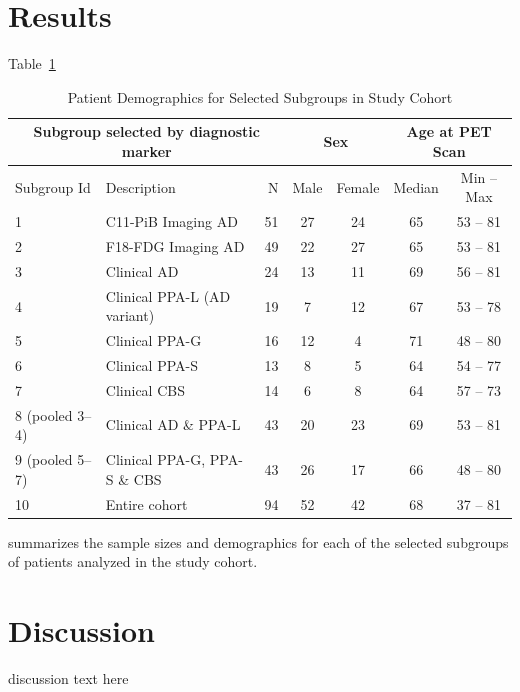\documentclass[10pt,twocolumn,twoside]{article}
\begin{document}
\section*{Results}
\label{secResults}
Table~\ref{tabPatDemo} 
\begin{table}[ht]\begin{center}
\caption{Patient Demographics for Selected Subgroups in Study Cohort}
\label{tabPatDemo}
\begin{tabular}{l l r | c c | c c  }
\multicolumn{3}{c|}{Subgroup selected by diagnostic marker} 
	& \multicolumn{2}{c|}{Sex} & \multicolumn{2}{c}{Age at PET Scan} \\ \hline
Subgroup Id      & Description                    & N  & Male & Female & Median & Min -- Max \\ \hline
1                & C11-PiB Imaging AD             & 51 & 27   & 24    & 65 & 53 -- 81 \\
2                & F18-FDG Imaging AD             & 49 & 22   & 27    & 65 & 53 -- 81 \\
3                & Clinical AD                    & 24 & 13   & 11    & 69 & 56 -- 81 \\
4                & Clinical PPA-L (AD variant)    & 19 &  7   & 12    & 67 & 53 -- 78 \\
5                & Clinical PPA-G                 & 16 & 12   &  4    & 71 & 48 -- 80 \\
6                & Clinical PPA-S                 & 13 &  8   &  5    & 64 & 54 -- 77 \\
7                & Clinical CBS                   & 14 &  6   &  8    & 64 & 57 -- 73 \\
8 (pooled 3--4)  & Clinical AD \& PPA-L           & 43 & 20   & 23    & 69 & 53 -- 81 \\
9 (pooled 5--7)  & Clinical PPA-G, PPA-S \& CBS   & 43 & 26   & 17    & 66 & 48 -- 80 \\
10               & Entire cohort                  & 94 & 52   & 42    & 68 & 37 -- 81 \\
\end{tabular}\end{center}\end{table}
summarizes the sample sizes and demographics for each of 
the selected subgroups of patients analyzed in the study cohort.


\section*{Discussion}
\label{secDiscussion}
discussion text here
\end{document}

